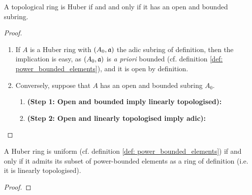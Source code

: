                 \begin{proposition} \label{prop: huber_criteria}
                    A topological ring is Huber if and and only if it has an open and bounded subring. 
                \end{proposition}
                    \begin{proof}
                        \noindent
                        \begin{enumerate}
                            \item If $A$ is a Huber ring with $(A_0, \mathfrak{a})$ the adic subring of definition, then the implication is easy, as $(A_0, \mathfrak{a})$ is \textit{a priori} bounded (cf. definition \ref{def: power_bounded_elements}), and it is open by definition. 
                            \item Conversely, suppose that $A$ has an open and bounded subring $A_0$. 
                                \begin{enumerate}
                                    \item \textbf{(Step 1: Open and bounded imply linearly topologised):}
                                    \item \textbf{(Step 2: Open and linearly topologised imply adic):}
                                \end{enumerate}
                        \end{enumerate}
                    \end{proof}
                \begin{corollary} \label{coro: uniformity_criterion}
                    A Huber ring is uniform (cf. definition \ref{def: power_bounded_elements}) if and only if it admits its subset of power-bounded elements as a ring of definition (i.e. it is linearly topologised). 
                \end{corollary}
                    \begin{proof}
                        
                    \end{proof}
                    
